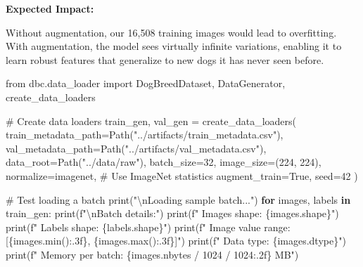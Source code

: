 \documentclass[
  letterpaper,
  DIV=11,
  numbers=noendperiod]{scrartcl}
\newenvironment{Shaded}{\begin{snugshade}}{\end{snugshade}}
\newcommand{\BuiltInTok}[1]{\textcolor[rgb]{0.00,0.23,0.31}{#1}}
\newcommand{\CharTok}[1]{\textcolor[rgb]{0.13,0.47,0.30}{#1}}
\newcommand{\CommentTok}[1]{\textcolor[rgb]{0.37,0.37,0.37}{#1}}
\newcommand{\ControlFlowTok}[1]{\textcolor[rgb]{0.00,0.23,0.31}{\textbf{#1}}}
\newcommand{\DecValTok}[1]{\textcolor[rgb]{0.68,0.00,0.00}{#1}}
\newcommand{\ImportTok}[1]{\textcolor[rgb]{0.00,0.46,0.62}{#1}}
\newcommand{\KeywordTok}[1]{\textcolor[rgb]{0.00,0.23,0.31}{\textbf{#1}}}
\newcommand{\NormalTok}[1]{\textcolor[rgb]{0.00,0.23,0.31}{#1}}
\newcommand{\OperatorTok}[1]{\textcolor[rgb]{0.37,0.37,0.37}{#1}}
\newcommand{\SpecialCharTok}[1]{\textcolor[rgb]{0.37,0.37,0.37}{#1}}
\newcommand{\SpecialStringTok}[1]{\textcolor[rgb]{0.13,0.47,0.30}{#1}}
\newcommand{\StringTok}[1]{\textcolor[rgb]{0.13,0.47,0.30}{#1}}
\newcommand{\VariableTok}[1]{\textcolor[rgb]{0.07,0.07,0.07}{#1}}
\renewenvironment{Shaded}{%
  \begin{tcolorbox}[%
    enhanced,%
    colback=codebg,%
    colframe=codebg,%
    borderline west={3pt}{0pt}{sectionblue},%
    boxrule=0pt,%
    arc=0pt,%
    boxsep=5pt,%
    left=2mm,%
    right=2mm,%
    top=2mm,%
    bottom=2mm%
  ]%
}{%
  \end{tcolorbox}%
}
\begin{document}
\textbf{Expected Impact:}

Without augmentation, our 16,508 training images would lead to
overfitting. With augmentation, the model sees virtually infinite
variations, enabling it to learn robust features that generalize to new
dogs it has never seen before.

\begin{Shaded}
\begin{Highlighting}[]
\ImportTok{from}\NormalTok{ dbc.data\_loader }\ImportTok{import}\NormalTok{ DogBreedDataset, DataGenerator, create\_data\_loaders}

\CommentTok{\# Create data loaders}
\NormalTok{train\_gen, val\_gen }\OperatorTok{=}\NormalTok{ create\_data\_loaders(}
\NormalTok{    train\_metadata\_path}\OperatorTok{=}\NormalTok{Path(}\StringTok{"../artifacts/train\_metadata.csv"}\NormalTok{),}
\NormalTok{    val\_metadata\_path}\OperatorTok{=}\NormalTok{Path(}\StringTok{"../artifacts/val\_metadata.csv"}\NormalTok{),}
\NormalTok{    data\_root}\OperatorTok{=}\NormalTok{Path(}\StringTok{"../data/raw"}\NormalTok{),}
\NormalTok{    batch\_size}\OperatorTok{=}\DecValTok{32}\NormalTok{,}
\NormalTok{    image\_size}\OperatorTok{=}\NormalTok{(}\DecValTok{224}\NormalTok{, }\DecValTok{224}\NormalTok{),}
\NormalTok{    normalize}\OperatorTok{=}\StringTok{\textquotesingle{}imagenet\textquotesingle{}}\NormalTok{,  }\CommentTok{\# Use ImageNet statistics}
\NormalTok{    augment\_train}\OperatorTok{=}\VariableTok{True}\NormalTok{,}
\NormalTok{    seed}\OperatorTok{=}\DecValTok{42}
\NormalTok{)}

\CommentTok{\# Test loading a batch}
\BuiltInTok{print}\NormalTok{(}\StringTok{"}\CharTok{\textbackslash{}n}\StringTok{Loading sample batch..."}\NormalTok{)}
\ControlFlowTok{for}\NormalTok{ images, labels }\KeywordTok{in}\NormalTok{ train\_gen:}
    \BuiltInTok{print}\NormalTok{(}\SpecialStringTok{f"}\CharTok{\textbackslash{}n}\SpecialStringTok{Batch details:"}\NormalTok{)}
    \BuiltInTok{print}\NormalTok{(}\SpecialStringTok{f"  Images shape: }\SpecialCharTok{\{}\NormalTok{images}\SpecialCharTok{.}\NormalTok{shape}\SpecialCharTok{\}}\SpecialStringTok{"}\NormalTok{)}
    \BuiltInTok{print}\NormalTok{(}\SpecialStringTok{f"  Labels shape: }\SpecialCharTok{\{}\NormalTok{labels}\SpecialCharTok{.}\NormalTok{shape}\SpecialCharTok{\}}\SpecialStringTok{"}\NormalTok{)}
    \BuiltInTok{print}\NormalTok{(}\SpecialStringTok{f"  Image value range: [}\SpecialCharTok{\{}\NormalTok{images}\SpecialCharTok{.}\BuiltInTok{min}\NormalTok{()}\SpecialCharTok{:.3f\}}\SpecialStringTok{, }\SpecialCharTok{\{}\NormalTok{images}\SpecialCharTok{.}\BuiltInTok{max}\NormalTok{()}\SpecialCharTok{:.3f\}}\SpecialStringTok{]"}\NormalTok{)}
    \BuiltInTok{print}\NormalTok{(}\SpecialStringTok{f"  Data type: }\SpecialCharTok{\{}\NormalTok{images}\SpecialCharTok{.}\NormalTok{dtype}\SpecialCharTok{\}}\SpecialStringTok{"}\NormalTok{)}
    \BuiltInTok{print}\NormalTok{(}\SpecialStringTok{f"  Memory per batch: }\SpecialCharTok{\{}\NormalTok{images}\SpecialCharTok{.}\NormalTok{nbytes }\OperatorTok{/} \DecValTok{1024} \OperatorTok{/} \DecValTok{1024}\SpecialCharTok{:.2f\}}\SpecialStringTok{ MB"}\NormalTok{)}
    

\end{Highlighting}
\end{Shaded}
\end{document}
